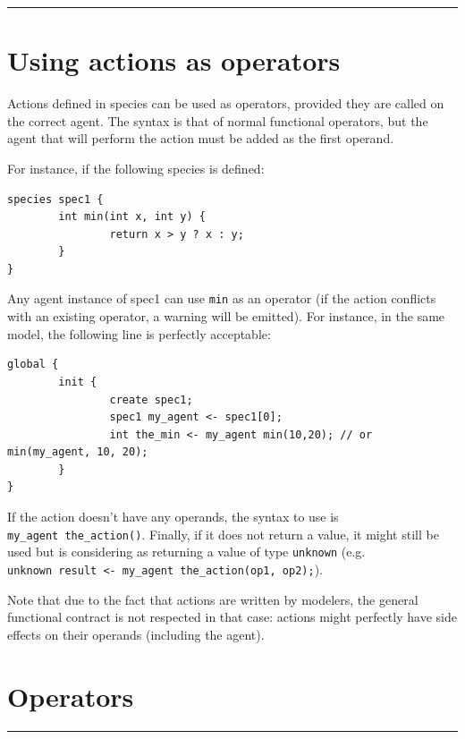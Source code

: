 \documentclass[]{book}
\theoremstyle{definition}
\theoremstyle{definition}
\theoremstyle{definition}
\theoremstyle{remark}
\begin{document}
\begin{center}\rule{0.5\linewidth}{\linethickness}\end{center}

\section{Using actions as operators}\label{using-actions-as-operators-3}

Actions defined in species can be used as operators, provided they are
called on the correct agent. The syntax is that of normal functional
operators, but the agent that will perform the action must be added as
the first operand.

For instance, if the following species is defined:

\begin{verbatim}
species spec1 {
        int min(int x, int y) {
                return x > y ? x : y;
        }
}
\end{verbatim}

Any agent instance of spec1 can use \texttt{min} as an operator (if the
action conflicts with an existing operator, a warning will be emitted).
For instance, in the same model, the following line is perfectly
acceptable:

\begin{verbatim}
global {
        init {
                create spec1;
                spec1 my_agent <- spec1[0];
                int the_min <- my_agent min(10,20); // or min(my_agent, 10, 20);
        }
}
\end{verbatim}

If the action doesn't have any operands, the syntax to use is
\texttt{my\_agent\ the\_action()}. Finally, if it does not return a
value, it might still be used but is considering as returning a value of
type \texttt{unknown} (e.g.
\texttt{unknown\ result\ \textless{}-\ my\_agent\ the\_action(op1,\ op2);}).

Note that due to the fact that actions are written by modelers, the
general functional contract is not respected in that case: actions might
perfectly have side effects on their operands (including the agent).

\section{Operators}\label{operators-3}

\begin{center}\rule{0.5\linewidth}{\linethickness}\end{center}
\end{document}
